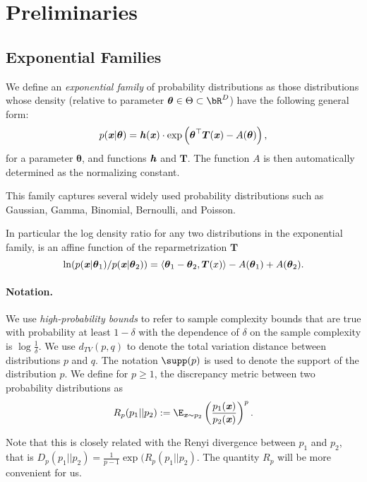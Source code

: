  \section{Preliminaries}

\subsection*{Exponential Families}
\begin{definition}\label{def:exp}
    We define an {\it exponential family} of probability distributions as those
distributions whose density (relative to parameter $\boldsymbol{\theta} \in \Theta \subset \bR^D$) have the following general form:
\[
p(\boldsymbol{\mathit{x}}|\boldsymbol{\theta}) = \boldsymbol{\mathit{h}}(\boldsymbol{\mathit{x}})\cdot \exp\left(\boldsymbol{\theta}^{\top}\boldsymbol{T}(\boldsymbol{\mathit{x}})-A(\boldsymbol{\theta})\right),
\]
for a parameter $\boldsymbol{\theta}$, and functions $\boldsymbol{\mathit{h}}$ and $\boldsymbol{T}$. The function $A$ is then automatically determined as the normalizing constant.
\end{definition}

This family captures several widely used probability distributions such as Gaussian, Gamma, Binomial, Bernoulli, and Poisson.


In particular the log density ratio for any two distributions in the exponential family, is an affine function of the reparmetrization $\boldsymbol{T}$
\begin{equation*}
    \ln(p(\boldsymbol{\mathit{x}} | \boldsymbol{\theta}_1)/p(\boldsymbol{\mathit{x}} | \boldsymbol{\theta}_2)) = \langle \boldsymbol{\theta}_1 - \boldsymbol{\theta}_2, \boldsymbol{T}(x)\rangle - A(\boldsymbol{\theta}_1) + A(\boldsymbol{\theta}_2). 
\end{equation*}
 \paragraph{Notation.} We use {\it high-probability bounds} to refer to sample complexity bounds that are true with probability at least $1-\delta$ with the dependence of $\delta$ on the sample complexity is $\log\frac{1}{\delta}$. We use $d_{TV}(p,q)$ to denote the total variation distance between distributions $p$ and $q$. The notation $\supp(p)$ is used to denote the support of the distribution $p$.
We define for $p \geq 1$, the discrepancy metric between two probability distributions as
\begin{equation*}
    R_{p}(p_1 || p_2) := \E_{\xx \sim p_2} \left(\frac{p_1(\xx)}{p_2(\xx)}\right)^p.
\end{equation*}

Note that this is closely related with the Renyi divergence between $p_1$ and $p_2$, that is $D_{p}(p_1 || p_2) = \frac{1}{p - 1} \exp(R_p(p_1 || p_2)$. The quantity $R_p$ will be more convenient for us.

